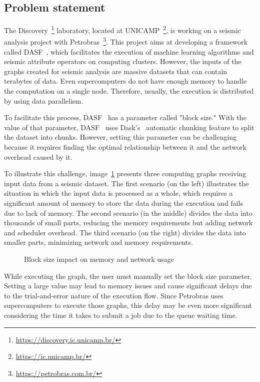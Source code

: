 \subsection{Problem statement}
\label{subsec:problem-statement}

The Discovery~\footnote{\url{https://discovery.ic.unicamp.br/}} laboratory, located at \ac{UNICAMP}~\footnote{\url{https://ic.unicamp.br/}}, is working on a seismic analysis project with Petrobras~\footnote{\url{https://petrobras.com.br/}}.
This project aims at developing a framework called \ac{DASF}~\cite{dasf}, which facilitates the execution of machine learning algorithms and seismic attribute operators on computing clusters.
However, the inputs of the graphs created for seismic analysis are massive datasets that can contain terabytes of data.
Even supercomputers do not have enough memory to handle the computation on a single node.
Therefore, usually, the execution is distributed by using data parallelism.

To facilitate this process, \ac{DASF}~\cite{dasf} has a parameter called "block size."
With the value of that parameter, \ac{DASF}~\cite{dasf} uses Dask's~\cite{dask} automatic chunking feature to split the dataset into chunks.
However, setting this parameter can be challenging because it requires finding the optimal relationship between it and the network overhead caused by it.

To illustrate this challenge, image~\ref{fig:block-size} presents three computing graphs receiving input data from a seismic dataset.
The first scenario (on the left) illustrates the situation in which the input data is processed as a whole, which requires a significant amount of memory to store the data during the execution and fails due to lack of memory.
The second scenario (in the middle) divides the data into thousands of small parts, reducing the memory requirements but adding network and scheduler overhead.
The third scenario (on the right) divides the data into smaller parts, minimizing network and memory requirements.

\begin{figure}[ht]
  \caption{Block size impact on memory and network usage}
  \label{fig:block-size}
\end{figure}

While executing the graph, the user must manually set the block size parameter.
Setting a large value may lead to memory issues and cause significant delays due to the trial-and-error nature of the execution flow.
Since Petrobras uses supercomputers to execute those graphs, this delay may be even more significant considering the time it takes to submit a job due to the queue waiting time.


